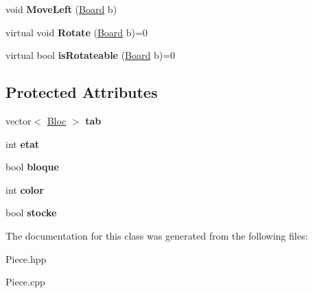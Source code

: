 \begin{DoxyCompactItemize}
\item 
\mbox{\label{class_piece_a08f2bd761965092bd4f8f97c81aa6af8}} 
void {\bfseries Move\+Left} (\hyperlink{class_board}{Board} b)
\item 
\mbox{\label{class_piece_aec441d76f79402f908b60c84abd7d998}} 
virtual void {\bfseries Rotate} (\hyperlink{class_board}{Board} b)=0
\item 
\mbox{\label{class_piece_a9a74ccee356f6587b48befeed98f1ca1}} 
virtual bool {\bfseries is\+Rotateable} (\hyperlink{class_board}{Board} b)=0
\end{DoxyCompactItemize}
\subsection*{Protected Attributes}
\begin{DoxyCompactItemize}
\item 
\mbox{\label{class_piece_a9ea65e906b9ef0c30594f4f5aa5ed444}} 
vector$<$ \hyperlink{class_bloc}{Bloc} $>$ {\bfseries tab}
\item 
\mbox{\label{class_piece_a9632e25aa0e79f8161451a937ccfc7ad}} 
int {\bfseries etat}
\item 
\mbox{\label{class_piece_a99b4e2bbf91e0e609fc5141135a2e0ad}} 
bool {\bfseries bloque}
\item 
\mbox{\label{class_piece_a4268f3b047e1ad284882708b85332ef1}} 
int {\bfseries color}
\item 
\mbox{\label{class_piece_af0c815c20f2000c02b6d7ce5b6703651}} 
bool {\bfseries stocke}
\end{DoxyCompactItemize}


The documentation for this class was generated from the following files\+:\begin{DoxyCompactItemize}
\item 
Piece.\+hpp\item 
Piece.\+cpp\end{DoxyCompactItemize}

